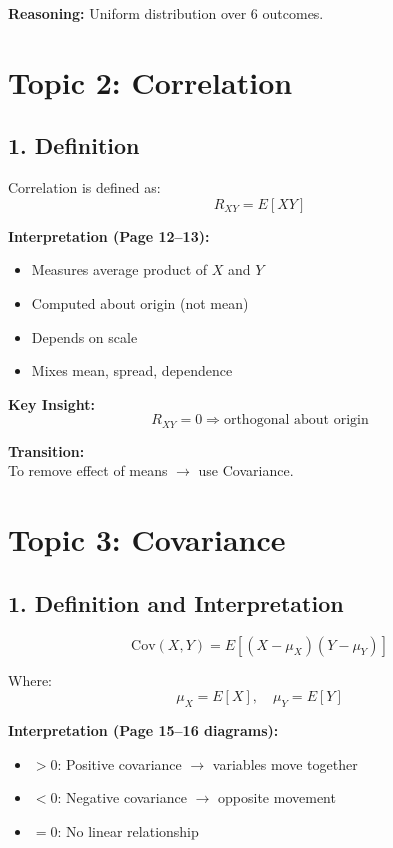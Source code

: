 \documentclass[11pt]{article}
\begin{document}
\noindent\textbf{Reasoning:} Uniform distribution over 6 outcomes.

\newpage

\section*{Topic 2: Correlation}

\subsection*{1. Definition}

\noindent Correlation is defined as:
\[
\boxed{R_{XY} = E[XY]}
\]

\noindent\textbf{Interpretation (Page 12–13):}
\begin{itemize}
    \item Measures average product of $X$ and $Y$
    \item Computed about origin (not mean)
    \item Depends on scale
    \item Mixes mean, spread, dependence
\end{itemize}

\noindent\textbf{Key Insight:}
\[
R_{XY} = 0 \Rightarrow \text{orthogonal about origin}
\]

\noindent\textbf{Transition:}\\
To remove effect of means $\rightarrow$ use Covariance.

\newpage

\section*{Topic 3: Covariance}

\subsection*{1. Definition and Interpretation}

\[
\text{Cov}(X,Y)=E[(X-\mu_X)(Y-\mu_Y)]
\]

\noindent Where:
\[
\mu_X = E[X], \quad \mu_Y = E[Y]
\]

\noindent\textbf{Interpretation (Page 15–16 diagrams):}
\begin{itemize}
    \item $>0$: Positive covariance $\rightarrow$ variables move together
    \item $<0$: Negative covariance $\rightarrow$ opposite movement
    \item $=0$: No linear relationship
\end{itemize}
\end{document}
